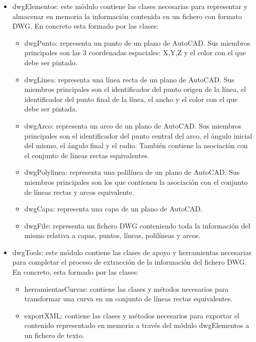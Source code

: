 \begin{itemize}

\item{dwgElementos: este módulo contiene las clases necesarias para representar y almacenar en memoria la información contenida en un fichero con formato DWG. En concreto esta formado por las clases:}

\begin{itemize}

\item{dwgPunto: representa un punto de un plano de AutoCAD. Sus miembros principales son las 3 coordenadas espaciales: X,Y,Z y el color con el que debe ser pintado.}
\item{dwgLinea: representa una línea recta de un plano de AutoCAD. Sus miembros principales son el identificador del punto origen de la línea, el identificador del punto final de la línea, el ancho y el color con el que debe ser pintada.}
\item{dwgArco: representa un arco de un plano de AutoCAD. Sus miembros principales son el identificador del punto central del arco, el ángulo inicial del mismo, el ángulo final y el radio. También contiene la asociación con el conjunto de líneas rectas equivalentes.}
\item{dwgPolylinea: representa una polilínea de un plano de AutoCAD. Sus miembros principales son los que  contienen la asociación con el conjunto de líneas rectas y arcos equivalente.}
\item{dwgCapa: representa una capa de un plano de AutoCAD.}
\item{dwgFile: representa un fichero DWG conteniendo toda la información del mismo relativa a capas, puntos, líneas, polilíneas y arcos.}

\end{itemize}

\item{dwgTools: este módulo contiene las clases de apoyo y herramientas necesarias para completar el proceso de extracción de la información del fichero DWG. En concreto, esta formado por las clases:}

\begin{itemize}

\item{herramientasCurvas: contiene las clases y métodos necesarios para transformar una curva en un conjunto de líneas rectas equivalentes.}
\item{exportXML: contiene las clases y métodos necesarios para exportar el contenido representado en memoria a través del módulo dwgElementos a un fichero de texto.}


\end{itemize}
\end{itemize}
